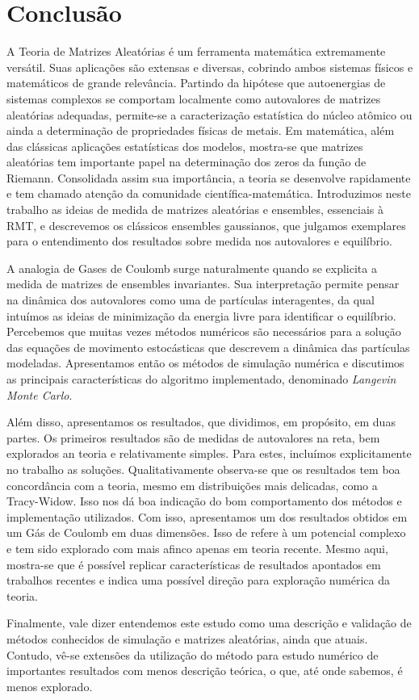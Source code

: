 \chapter{Conclusão}
\label{Capitulo: Conclusão}

A Teoria de Matrizes Aleatórias é um ferramenta matemática extremamente versátil. Suas aplicações são extensas e diversas, cobrindo ambos sistemas físicos e matemáticos de grande relevância. Partindo da hipótese que autoenergias de sistemas complexos se comportam localmente como autovalores de matrizes aleatórias adequadas, permite-se a caracterização estatística do núcleo atômico ou ainda a determinação de propriedades físicas de metais. Em matemática, além das clássicas aplicações estatísticas dos modelos, mostra-se que matrizes aleatórias tem importante papel na determinação dos zeros da função de Riemann. Consolidada assim sua importância, a teoria se desenvolve rapidamente e tem chamado atenção da comunidade científica-matemática. Introduzimos neste trabalho as ideias de medida de matrizes aleatórias e ensembles, essenciais à RMT, e descrevemos os clássicos ensembles gaussianos, que julgamos exemplares para o entendimento dos resultados sobre medida nos autovalores e equilíbrio.
 
A analogia de Gases de Coulomb surge naturalmente quando se explicita a medida de matrizes de ensembles invariantes. Sua interpretação permite pensar na dinâmica dos autovalores como uma de partículas interagentes, da qual intuímos as ideias de minimização da energia livre para identificar o equilíbrio. Percebemos que muitas vezes métodos numéricos são necessários para a solução das equações de movimento estocásticas que descrevem a dinâmica das partículas modeladas. Apresentamos então os métodos de simulação numérica e discutimos as principais características do algoritmo implementado, denominado \textit{Langevin Monte Carlo}.

Além disso, apresentamos os resultados, que dividimos, em propósito, em duas partes. Os primeiros resultados são de medidas de autovalores na reta, bem explorados an teoria e relativamente simples. Para estes, incluímos explicitamente no trabalho as soluções. Qualitativamente observa-se que os resultados tem boa concordância com a teoria, mesmo em distribuições mais delicadas, como a Tracy-Widow. Isso nos dá boa indicação do bom comportamento dos métodos e implementação utilizados. Com isso, apresentamos um dos resultados obtidos em um Gás de Coulomb em duas dimensões. Isso de refere à um potencial complexo e tem sido explorado com mais afinco apenas em teoria recente. Mesmo aqui, mostra-se que é possível replicar características de resultados apontados em trabalhos recentes e indica uma possível direção para exploração numérica da teoria.

Finalmente, vale dizer entendemos este estudo como uma descrição e validação de métodos conhecidos de simulação e matrizes aleatórias, ainda que atuais. Contudo, vê-se extensões da utilização do método para estudo numérico de importantes resultados com menos descrição teórica, o que, até onde sabemos, é menos explorado.
